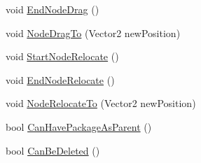 \begin{DoxyCompactItemize}
\item 
void \hyperlink{classi_c_s___editor_object_a6d155323fe31f36bb49d20cc008b8d55}{End\+Node\+Drag} ()
\item 
void \hyperlink{classi_c_s___editor_object_ac63a30e78fabfbcda64f0a0729b6a8cc}{Node\+Drag\+To} (Vector2 new\+Position)
\item 
void \hyperlink{classi_c_s___editor_object_a0e2de3fc40fc69043855c21114daecd8}{Start\+Node\+Relocate} ()
\item 
void \hyperlink{classi_c_s___editor_object_a2637f261cc4b6a5f019f6e21bf3f5e3b}{End\+Node\+Relocate} ()
\item 
void \hyperlink{classi_c_s___editor_object_a316811230355c2f80be40d0e74b83375}{Node\+Relocate\+To} (Vector2 new\+Position)
\item 
bool \hyperlink{classi_c_s___editor_object_a73a5e3fa70424121b8232dfedea1b1df}{Can\+Have\+Package\+As\+Parent} ()
\item 
bool \hyperlink{classi_c_s___editor_object_ab5657f711d431b0dc4e94a9837d88650}{Can\+Be\+Deleted} ()
\end{DoxyCompactItemize}
